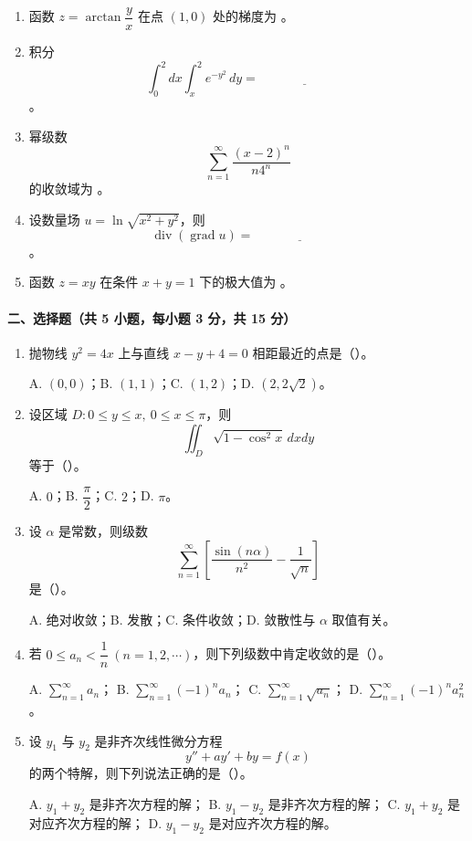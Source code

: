 \begin{enumerate}
  \item 函数 $z=\arctan\dfrac{y}{x}$ 在点 $(1,0)$ 处的梯度为 \underline{\hspace{3cm}}。

  \item 积分
  \[
    \int_0^2 dx\int_x^2 e^{-y^2}\,dy
    =
    \underline{\hspace{3cm}}
  \]
  。

  \item 幂级数
  \[
    \sum_{n=1}^{\infty}\frac{(x-2)^n}{n4^n}
  \]
  的收敛域为 \underline{\hspace{3cm}}。

  \item 设数量场 $u=\ln\sqrt{x^2+y^2}$，则
  \[
    \operatorname{div}(\operatorname{grad}u)=\underline{\hspace{3cm}}
  \]
  。

  \item 函数 $z=xy$ 在条件 $x+y=1$ 下的极大值为 \underline{\hspace{3cm}}。
\end{enumerate}

\paragraph{二、选择题（共 5 小题，每小题 3 分，共 15 分）}

\begin{enumerate}
  \item 抛物线 $y^2=4x$ 上与直线 $x-y+4=0$ 相距最近的点是（\quad）。

  A. $(0,0)$；\quad B. $(1,1)$；\quad C. $(1,2)$；\quad D. $(2,2\sqrt2)$。

  \item 设区域 $D:0\le y\le x,\ 0\le x\le \pi$，则
  \[
    \iint_D \sqrt{1-\cos^2 x}\,dxdy
  \]
  等于（\quad）。

  A. $0$；\quad B. $\dfrac{\pi}{2}$；\quad C. $2$；\quad D. $\pi$。

  \item 设 $\alpha$ 是常数，则级数
  \[
    \sum_{n=1}^{\infty}\left[\frac{\sin(n\alpha)}{n^2}-\frac1{\sqrt n}\right]
  \]
  是（\quad）。

  A. 绝对收敛；\quad B. 发散；\quad C. 条件收敛；\quad D. 敛散性与 $\alpha$ 取值有关。

  \item 若 $0\le a_n<\dfrac1n\ (n=1,2,\cdots)$，则下列级数中肯定收敛的是（\quad）。

  A. $\sum_{n=1}^{\infty}a_n$；\quad
  B. $\sum_{n=1}^{\infty}(-1)^na_n$；\quad
  C. $\sum_{n=1}^{\infty}\sqrt{a_n}$；\quad
  D. $\sum_{n=1}^{\infty}(-1)^na_n^2$。

  \item 设 $y_1$ 与 $y_2$ 是非齐次线性微分方程
  \[
    y''+ay'+by=f(x)
  \]
  的两个特解，则下列说法正确的是（\quad）。

  A. $y_1+y_2$ 是非齐次方程的解；\quad
  B. $y_1-y_2$ 是非齐次方程的解；\quad
  C. $y_1+y_2$ 是对应齐次方程的解；\quad
  D. $y_1-y_2$ 是对应齐次方程的解。
\end{enumerate}

